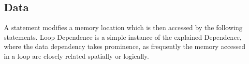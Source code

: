 \documentclass{article}
\begin{document}
\subsection{Data}
\hspace{10mm} A statement modifies a memory location which is then accessed by the following statements.
\hfill \break
\hfill \break
Loop Dependence is a simple instance of the explained Dependence, where the data dependency takes prominence, as
frequently the memory accessed in a loop are closely related spatially or logically.
\end{document}
